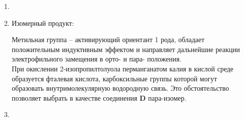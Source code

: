 \begin{enumerate}
    \item \hspace{28pt}\\
    \begin{center}
    \end{center}
    \item Изомерный продукт: 
    \begin{center}
    \end{center}
    Метильная группа – активирующий ориентант 1 рода, обладает положительным индуктивным эффектом и направляет дальнейшие реакции электрофильного замещения в орто- и пара- положения.\\
    При окислении 2-изопропилтолуола перманганатом калия в кислой среде образуется фталевая кислота, карбоксильные группы которой могут образовать внутримолекулярную водородную связь. Это обстоятельство позволяет выбрать в качестве соединения \textbf{D} пара-изомер.
    \item \hspace{28pt}\\
    \begin{center}
    \end{center}
    
    \end{enumerate}
    